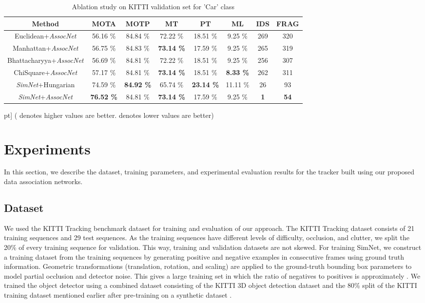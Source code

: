 \documentclass[letterpaper, 10 pt, conference]{ieeeconf}
\begin{document}
\begin{table*}[ht]
\vspace{1.5em}
\caption{Ablation study on KITTI validation set for 'Car' class}
\centering
\begin{tabular}{cccccccc}
\hline \hline
Method & MOTA  & MOTP  & MT  & PT  & ML  & IDS  & FRAG  \\
\hline \hline
Euclidean+\textit{AssocNet} & 56.16 \% & 84.84 \% & 72.22 \% & 18.51 \% & 9.25 \% & 269 & 320 \\
Manhattan+\textit{AssocNet} & 56.75 \% & 84.83 \% & \bf{73.14} \% & 17.59 \% & 9.25 \% & 265 & 319 \\
Bhattacharyya+\textit{AssocNet} & 56.69 \% & 84.81 \% & 72.22 \% & 18.51 \% & 9.25 \% & 256 & 307 \\
ChiSquare+\textit{AssocNet} & 57.17 \% & 84.81 \% & \bf{73.14} \% & 18.51 \% & \bf{8.33} \% & 262 & 311 \\
\textit{SimNet}+Hungarian & 74.59 \% & \bf{84.92} \% & 65.74 \% & \bf{23.14} \% & 11.11 \% & 26 & 93 \\
\textit{SimNet}+\textit{AssocNet} & \bf{76.52} \% & 84.81 \% & \bf{73.14} \% & 17.59 \% & 9.25 \% & \bf{1} & \bf{54} \\
\hline
\end{tabular}
\label{table:ablation}
\5pt]
( denotes higher values are better.  denotes lower values are better)
\end{table*}



\section{Experiments}
In this section, we describe the dataset, training parameters, and experimental evaluation results for the tracker built using our proposed data association networks.

\subsection{Dataset}
We used the KITTI Tracking benchmark dataset for training and evaluation of our approach. The KITTI Tracking dataset consists of 21 training sequences and 29 test sequences. As the training sequences have different levels of difficulty, occlusion, and clutter, we split the 20\% of every training sequence for validation. This way, training and validation datasets are not skewed. For training SimNet, we construct a training dataset from the training sequences by generating positive and negative examples in consecutive frames using ground truth information. Geometric transformations (translation, rotation, and scaling) are applied to the ground-truth bounding box parameters to model partial occlusion and detector noise. This gives a large training set in which the ratio of negatives to positives is approximately . We trained the object detector using a combined dataset consisting of the KITTI 3D object detection dataset and the 80\% split of the KITTI training dataset mentioned earlier after pre-training on a synthetic dataset \cite{hurl2019precise}.
\end{document}
